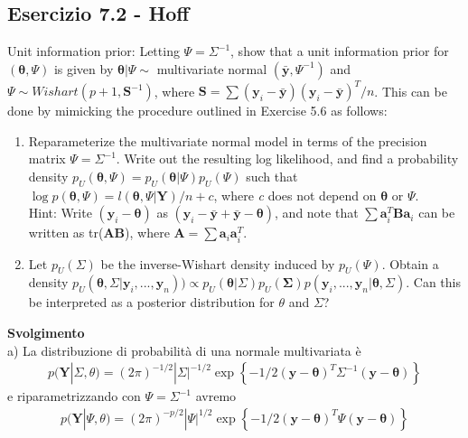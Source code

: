 \subsection{Esercizio 7.2 - Hoff}

Unit information prior: Letting $ \Psi = \Sigma^{-1} $, show that a unit information prior for $(\boldsymbol{\theta},\Psi)$ is given by $\boldsymbol{\theta}|\Psi \sim $ multivariate normal $(\bar{\textbf{y}}, \Psi^{-1})$ and $\Psi \sim Wishart(p+1, \textbf{S}^{-1})$, where $\textbf{S} = \sum(\textbf{y}_i-\bar{\textbf{y}})(\textbf{y}_i-\bar{\textbf{y}})^{T}/n$. This can be done by mimicking the procedure outlined in Exercise 5.6 as follows:
\begin{enumerate}[label=\alph*)]
\item Reparameterize the multivariate normal model in terms of the precision matrix $\Psi = \Sigma^{-1}$. Write out the resulting log likelihood, and find a probability density $p_{U}(\boldsymbol{\theta},\Psi) = p_{U}(\boldsymbol{\theta}|\Psi)p_{U}(\Psi)$ such that $\log p(\boldsymbol{\theta},\Psi) = l(\boldsymbol{\theta},\Psi|\textbf{Y})/n+c$, where \textit{c} does not depend on $\boldsymbol{\theta}$ or $\Psi$.\\
Hint: Write $(\textbf{y}_i - \boldsymbol{\theta})$ as $(\textbf{y}_i - \bar{\textbf{y}}+\bar{\textbf{y}} - \boldsymbol{\theta})$, and note that $\sum\textbf{a}_i^T\textbf{Ba}_i$ can be written as tr(\textbf{AB}), where $\textbf{A} = \sum\textbf{a}_i\textbf{a}_i^T$.
\item Let $p_U(\Sigma)$ be the inverse-Wishart density induced by $p_U(\Psi)$. 
Obtain a density
$p_U(\boldsymbol{\theta},\Sigma|\textbf{y}_i,...,\textbf{y}_n)) \propto p_U(\boldsymbol{\theta}|\Sigma)p_U(\boldsymbol{\Sigma})p(\textbf{y}_i,...,\textbf{y}_n|\boldsymbol{\theta},\Sigma)$. 
Can this be interpreted as a posterior distribution for $\theta$ and $\Sigma$?
\end{enumerate}
\textbf{Svolgimento}\\

a) La distribuzione di probabilità di una normale multivariata è 
\begin{align*}
p(\textbf{Y}|\Sigma,\theta) = (2\pi)^{-1/2}|\Sigma|^{-1/2}\exp\left\{-1/2(\textbf{y}-\boldsymbol{\theta})^T\Sigma^{-1}(\textbf{y}-\boldsymbol{\theta})\right\}
\end{align*}
e riparametrizzando con $\Psi = \Sigma^{-1} $ avremo
\begin{align*}
p(\textbf{Y}|\Psi,\theta) = (2\pi)^{-p/2}|\Psi|^{1/2}\exp\left\{-1/2(\textbf{y}-\boldsymbol{\theta})^T\Psi(\textbf{y}-\boldsymbol{\theta})\right\}
\end{align*}

